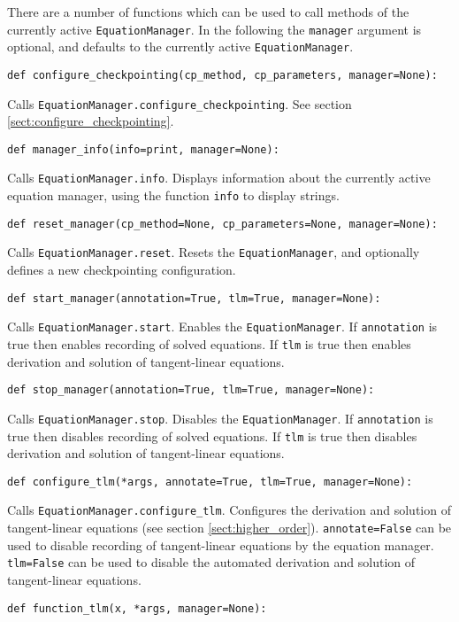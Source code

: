 \documentclass[11pt]{article}
\begin{document}
There are a number of functions which can be used to call methods of the
currently active \texttt{EquationManager}. In the following the
\texttt{manager} argument is optional, and defaults to the currently active
\texttt{EquationManager}.
\begin{lstlisting}
def configure_checkpointing(cp_method, cp_parameters, manager=None):
\end{lstlisting}
Calls \texttt{EquationManager.configure\_checkpointing}. See section
\ref{sect:configure_checkpointing}.
\begin{lstlisting}
def manager_info(info=print, manager=None):
\end{lstlisting}
Calls \texttt{EquationManager.info}. Displays information about the currently
active equation manager, using the function \texttt{info} to display strings.
\begin{lstlisting}
def reset_manager(cp_method=None, cp_parameters=None, manager=None):
\end{lstlisting}
Calls \texttt{EquationManager.reset}. Resets the \texttt{EquationManager}, and
optionally defines a new checkpointing configuration.
\begin{lstlisting}
def start_manager(annotation=True, tlm=True, manager=None):
\end{lstlisting}
Calls \texttt{EquationManager.start}. Enables the \texttt{EquationManager}. If
\texttt{annotation} is true then enables recording of solved equations. If
\texttt{tlm} is true then enables derivation and solution of tangent-linear
equations.
\begin{lstlisting}
def stop_manager(annotation=True, tlm=True, manager=None):
\end{lstlisting}
Calls \texttt{EquationManager.stop}. Disables the \texttt{EquationManager}. If
\texttt{annotation} is true then disables recording of solved equations. If
\texttt{tlm} is true then disables derivation and solution of tangent-linear
equations.
\begin{lstlisting}
def configure_tlm(*args, annotate=True, tlm=True, manager=None):
\end{lstlisting}
Calls \texttt{EquationManager.configure\_tlm}. Configures the derivation and
solution of tangent-linear equations (see section \ref{sect:higher_order}).
\texttt{annotate=False} can be used to disable recording of tangent-linear
equations by the equation manager. \texttt{tlm=False} can be used to disable
the automated derivation and solution of tangent-linear equations.
\begin{lstlisting}
def function_tlm(x, *args, manager=None):
\end{lstlisting}
\end{document}
